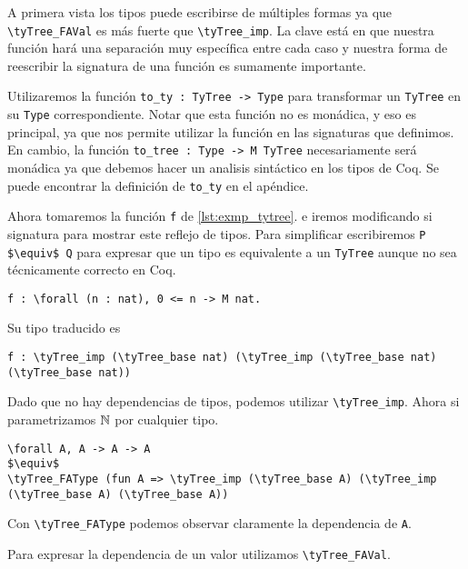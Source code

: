 A primera vista los tipos puede escribirse de múltiples formas ya que \lstinline{\tyTree_FAVal} es más fuerte que \lstinline{\tyTree_imp}. La clave está en que nuestra función \lift hará una separación muy específica entre cada caso y nuestra forma de reescribir la signatura de una función es sumamente importante.

Utilizaremos la función \lstinline{to_ty : TyTree -> Type} para transformar un \lstinline{TyTree} en su \lstinline{Type} correspondiente. Notar que esta función no es monádica, y eso es principal, ya que nos permite utilizar la función en las signaturas que definimos. En cambio, la función \lstinline{to_tree : Type -> M TyTree} necesariamente será monádica ya que debemos hacer un analisis sintáctico en los tipos de Coq. Se puede encontrar la definición de \lstinline{to_ty} en el apéndice.

\iffalse
Ahora tomaremos la función \lstinline{f} de \ref{lst:exmp_tytree}. e iremos modificando si signatura para mostrar este reflejo de tipos.
Para simplificar escribiremos \lstinline{P $\equiv$ Q} para expresar que un tipo es equivalente a un \lstinline{TyTree} aunque no sea técnicamente correcto en Coq.

\begin{lstlisting}
f : \forall (n : nat), 0 <= n -> M nat.
\end{lstlisting}

Su tipo traducido es

\begin{lstlisting}
f : \tyTree_imp (\tyTree_base nat) (\tyTree_imp (\tyTree_base nat) (\tyTree_base nat))
\end{lstlisting}

Dado que no hay dependencias de tipos, podemos utilizar \lstinline{\tyTree_imp}. Ahora si parametrizamos
$\mathbb{N}$ por cualquier tipo.

\begin{lstlisting}
\forall A, A -> A -> A
$\equiv$
\tyTree_FAType (fun A => \tyTree_imp (\tyTree_base A) (\tyTree_imp (\tyTree_base A) (\tyTree_base A))
\end{lstlisting}

Con \lstinline{\tyTree_FAType} podemos observar claramente la dependencia de \lstinline{A}.

Para expresar la dependencia de un valor utilizamos \lstinline{\tyTree_FAVal}.

